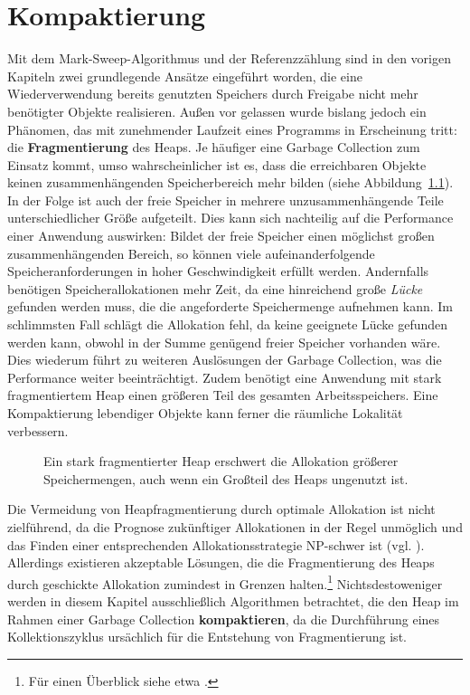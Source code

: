 \chapter{Kompaktierung}
\label{cha:compacting}
Mit dem Mark-Sweep-Algorithmus und der Referenzzählung sind in den vorigen Kapiteln zwei grundlegende Ansätze eingeführt worden, die eine Wiederverwendung bereits genutzten Speichers durch Freigabe nicht mehr benötigter Objekte realisieren.
Außen vor gelassen wurde bislang jedoch ein Phänomen, das mit zunehmender Laufzeit eines Programms in Erscheinung tritt:
die \textbf{Fragmentierung} des Heaps.
Je häufiger eine Garbage Collection zum Einsatz kommt, umso wahrscheinlicher ist es, dass die erreichbaren Objekte keinen zusammenhängenden Speicherbereich mehr bilden (siehe Abbildung~\ref{fig:fragmentation}).
In der Folge ist auch der freie Speicher in mehrere unzusammenhängende Teile unterschiedlicher Größe aufgeteilt.
Dies kann sich nachteilig auf die Performance einer Anwendung auswirken:
Bildet der freie Speicher einen möglichst großen zusammenhängenden Bereich, so können viele aufeinanderfolgende Speicheranforderungen in hoher Geschwindigkeit erfüllt werden.
Andernfalls benötigen Speicherallokationen mehr Zeit, da eine hinreichend große \textit{Lücke} gefunden werden muss, die die angeforderte Speichermenge aufnehmen kann.
Im schlimmsten Fall schlägt die Allokation fehl, da keine geeignete Lücke gefunden werden kann, obwohl in der Summe genügend freier Speicher vorhanden wäre.
Dies wiederum führt zu weiteren Auslösungen der Garbage Collection, was die Performance weiter beeinträchtigt.
Zudem benötigt eine Anwendung mit stark fragmentiertem Heap einen größeren Teil des gesamten Arbeitsspeichers.
Eine Kompaktierung lebendiger Objekte kann ferner die räumliche Lokalität verbessern.

\begin{figure}[h]
	\centering
	
	\caption[Fragmentierter Heap]{Ein stark fragmentierter Heap erschwert die Allokation größerer Speichermengen, auch wenn ein Großteil des Heaps ungenutzt ist.}
	\label{fig:fragmentation}
\end{figure}

Die Vermeidung von Heapfragmentierung durch optimale Allokation ist nicht zielführend, da die Prognose zukünftiger Allokationen in der Regel unmöglich und das Finden einer entsprechenden Allokationsstrategie NP-schwer ist (vgl. \cite{robson1980}).
Allerdings existieren akzeptable Lösungen, die die Fragmentierung des Heaps durch geschickte Allokation zumindest in Grenzen halten.\footnote{Für einen Überblick siehe etwa \cite[Kap. 7]{handbook}.}
Nichtsdestoweniger werden in diesem Kapitel ausschließlich Algorithmen betrachtet, die den Heap im Rahmen einer Garbage Collection \textbf{kompaktieren}, da die Durchführung eines Kollektionszyklus ursächlich für die Entstehung von Fragmentierung ist.

